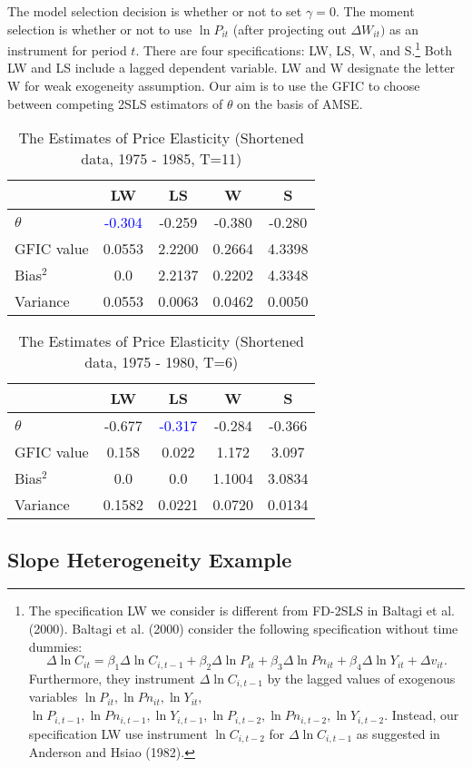 The model selection decision is whether or not to set $\gamma = 0$. The moment selection is whether or not to use $\ln P_{it}$ (after projecting out $\Delta W_{it})$ as an instrument for period $t$.  There are four specifications:  LW, LS, W, and S.\footnote{The specification LW we consider is different from FD-2SLS in Baltagi et al. (2000). Baltagi et al. (2000) consider the following specification without time dummies:
 \[
\Delta \ln C_{it} = \beta_1 \Delta \ln C_{i,t-1} +  \beta_2 \Delta \ln P_{it} +\beta_3 \Delta \ln Pn_{it} +  \beta_4 \Delta \ln Y_{it} + \Delta v_{it}.
\]
Furthermore, they instrument $\Delta \ln C_{i,t-1}$ by the lagged values of exogenous variables $\ln P_{it}, \ln Pn_{it}, \ln Y_{it},$ $\ln P_{i,t-1}, \ln Pn_{i,t-1}, \ln Y_{i,t-1}, \ln P_{i,t-2}, \ln Pn_{i,t-2}, \ln Y_{i,t-2}$. Instead, our specification LW use instrument $\ln C_{i, t-2}$ for $\Delta \ln C_{i,t-1}$ as suggested in Anderson and Hsiao (1982).}
 Both LW and LS include a lagged dependent variable. LW and W designate the letter W for weak exogeneity assumption. Our aim is to use the GFIC to choose between competing 2SLS estimators of $\theta$ on the basis of AMSE. %
\newpage


\begin{table}[h!]\centering
 \caption{The Estimates of Price Elasticity (Shortened data, 1975 - 1985, T=11)}
\begin{tabular}{l c c c c }\hline\hline 
 & LW   &      LS   &       W   &      S\\
\hline
$\theta$ & \textcolor{blue}{-0.304} & -0.259 &  -0.380 &  -0.280\\
\hline
GFIC value &0.0553 & 2.2200 & 0.2664 &  4.3398\\
Bias$^2$ & 0.0 & 2.2137 & 0.2202 & 4.3348\\
Variance & 0.0553 & 0.0063 & 0.0462 & 0.0050\\ 
\hline
\hline
\end{tabular}
\end{table}



\begin{table}[h!]\centering
 \caption{The Estimates of Price Elasticity (Shortened data, 1975 - 1980, T=6)}
\begin{tabular}{l c c c c }\hline\hline 
 & LW   &      LS   &       W   &      S\\
\hline
$\theta$ & -0.677 & \textcolor{blue}{ -0.317} &  -0.284 &  -0.366\\
\hline
GFIC value &0.158 & 0.022 & 1.172& 3.097\\
Bias$^2$ & 0.0 & 0.0 & 1.1004 & 3.0834\\
Variance &0.1582 & 0.0221 & 0.0720 & 0.0134\\ 
\hline
\hline
\end{tabular}
\end{table}


\subsection{Slope Heterogeneity Example}
\label{sec:townsend}
